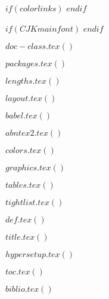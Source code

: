 %

%

%




$if(colorlinks)$
$endif$

$if(CJKmainfont)$
$endif$

$doc-class.tex()$


$packages.tex()$

$lengths.tex()$

$layout.tex()$

$babel.tex()$

$abntex2.tex()$

$colors.tex()$

$graphics.tex()$

$tables.tex()$

$tightlist.tex()$

$def.tex()$

$title.tex()$

$hypersetup.tex()$

$toc.tex()$

$biblio.tex()$

